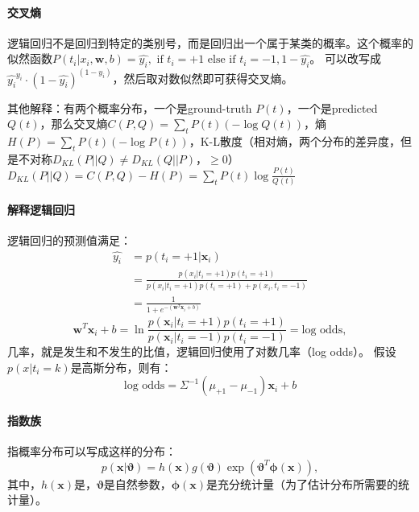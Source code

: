 \paragraph{交叉熵} 逻辑回归不是回归到特定的类别号，而是回归出一个属于某类的概率。这个概率的似然函数$P(t_i|x_i,\bm w,b) = \hat{y_i},\text{ if }t_i = +1\text{ else if }t_i = -1, 1 - \hat{y_i}$。
可以改写成$\hat{y_i}^{y_i}\cdot(1-\hat{y_i})^{(1-y_i)}$，然后取对数似然即可获得交叉熵。

其他解释：有两个概率分布，一个是ground-truth $P(t)$，一个是predicted $Q(t)$，那么交叉熵$C(P,Q) = \sum_tP(t)(-\log Q(t))$，熵$H(P)=\sum_tP(t)(-\log P(t))$，K-L散度（相对熵，两个分布的差异度，但是不对称$D_{KL}(P||Q) \neq D_{KL}(Q||P)$，$\ge 0$）$D_{KL}(P||Q) = C(P,Q) - H(P) = \sum_tP(t)\log{\frac{P(t)}{Q(t)}}$

\paragraph{解释逻辑回归}逻辑回归的预测值满足：
$$
\begin{array}{ll}
\hat{y_i} &= p(t_i = +1 |\bm x_i) \\
&= \frac{p(x_i|t_i=+1)p(t_i=+1)}{p(x_i|t_i=+1)p(t_i=+1) + p(x_i,t_i=-1)} \\
& = \frac{1}{1+e^{-(\bm w^T\bm x_i + b)}}
\end{array}
$$
$$\bm w^T\bm x_i + b = \ln \frac{p(\bm x_i| t_i = +1)p(t_i = +1)}{p(\bm x_i| t_i = -1)p(t_i = -1)} = \text{log odds},$$
几率，就是发生和不发生的比值，逻辑回归使用了对数几率（log odds）。
假设$p(x|t_i=k)$是高斯分布，则有：
$$\text{log odds} = \Sigma^{-1}(\mu_{+1}-\mu_{-1})\bm x_i + b$$

\paragraph{指数族} 指概率分布可以写成这样的分布：
$$p(\bm x|\bm \vartheta) = h(\bm x)g(\bm\vartheta)\exp(\bm\vartheta^T\bm\phi(\bm x)),$$
其中，$h(\bm x)$是，$\bm\vartheta$是自然参数，$\bm\phi(\bm x)$是充分统计量（为了估计分布所需要的统计量）。

